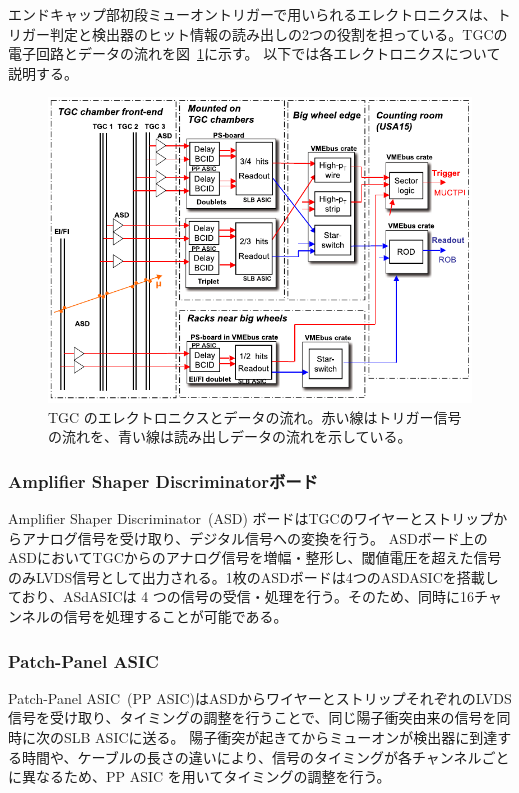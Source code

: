 エンドキャップ部初段ミューオントリガーで用いられるエレクトロニクスは、トリガー判定と検出器のヒット情報の読み出しの2つの役割を担っている。TGCの電子回路とデータの流れを図~\ref{fig:TGC_electro}に示す。
以下では各エレクトロニクスについて説明する。

\begin{figure}[tb]
  \centering
  \includegraphics[clip, width=14cm]{fig/3/electronics.pdf}
  \caption{TGC のエレクトロニクスとデータの流れ\cite{Aad:1129811}。赤い線はトリガー信号の流れを、青い線は読み出しデータの流れを示している。}
  \label{fig:TGC_electro}
\end{figure}

\subsubsection{Amplifier Shaper Discriminatorボード}
Amplifier Shaper Discriminator~(ASD) ボードはTGCのワイヤーとストリップからアナログ信号を受け取り、デジタル信号への変換を行う。
ASDボード上のASDにおいてTGCからのアナログ信号を増幅・整形し、閾値電圧を超えた信号のみLVDS信号として出力される。1枚のASDボードは4つのASDASICを搭載しており、ASdASICは 4 つの信号の受信・処理を行う。そのため、同時に16チャンネルの信号を処理することが可能である。

\subsubsection{Patch-Panel ASIC}
Patch-Panel ASIC~(PP ASIC)はASDからワイヤーとストリップそれぞれのLVDS信号を受け取り、タイミングの調整を行うことで、同じ陽子衝突由来の信号を同時に次のSLB ASICに送る。
陽子衝突が起きてからミューオンが検出器に到達する時間や、ケーブルの長さの違いにより、信号のタイミングが各チャンネルごとに異なるため、PP ASIC を用いてタイミングの調整を行う。

